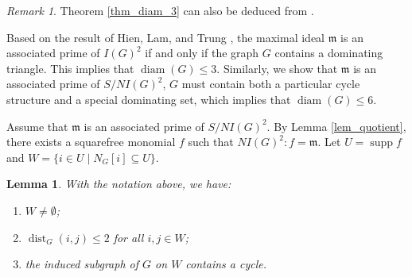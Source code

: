 \documentclass[12pt,reqno,twoside]{amsart}
\newcommand{\mm}{\mathfrak m}
\DeclareMathOperator{\diam}{diam}
\DeclareMathOperator{\dist}{dist}
\DeclareMathOperator{\supp}{supp}
\newtheorem{lem}[thm]{\bf Lemma}
\theoremstyle{definition}
\theoremstyle{plain}
\theoremstyle{remark}
\newtheorem{rem}[thm]{Remark}
\numberwithin{equation}{section}
\begin{document}
\begin{rem} Theorem \ref{thm_diam_3} can also be deduced from \cite[Theorem 5.2]{Al}.     
\end{rem}



Based on the result of Hien, Lam, and Trung \cite{HLT}, the maximal ideal $\mm$ is an associated prime of $I(G)^2$ if and only if the graph $G$ contains a dominating triangle. This implies that $\diam(G) \leq 3$. Similarly, we show that $\mm$ is an associated prime of $S/NI(G)^2$, $G$ must contain both a particular cycle structure and a special dominating set, which implies that $\diam(G) \le 6$.

 
Assume that $\mm$ is an associated prime of $S/NI(G)^2$. By Lemma \ref{lem_quotient}, there exists a squarefree monomial $f$ such that $NI(G)^2 : f = \mm$. Let $U = \supp f$ and $W = \{ i \in U \mid N_G[i] \subseteq U\}$.

\begin{lem}\label{lem_directed_cycle}
With the notation above, we have:
\begin{enumerate}
    \item $W \neq \emptyset$;
    \item $\dist_G(i,j) \le 2$ for all $i,j \in W$;
    \item the induced subgraph of $G$ on $W$ contains a cycle.
\end{enumerate}
\end{lem}
\end{document}
